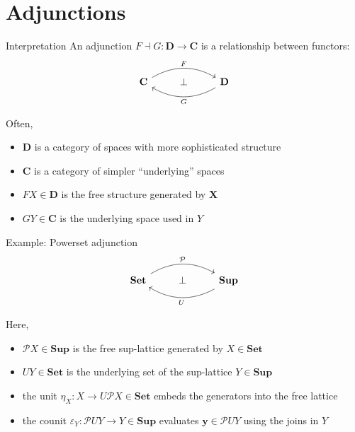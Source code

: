 \documentclass[aspectratio=1610,mathserif]{beamer}
\begin{document}
\section{Adjunctions} %
\frame\sectionpage

\begin{frame}[fragile]{Interpretation}
  An adjunction $F \dashv G : \mathbf{D} \rightarrow \mathbf{C}$
  is a relationship between functors:
  \[
    \begin{tikzcd}
      \mathbf{C} \ar[rr, bend left, "F"] &
      \bot &
      \mathbf{D} \ar[ll, bend left, "G"]
    \end{tikzcd}
  \]

  Often,
  \begin{itemize}
    \item $\mathbf{D}$ is a category of spaces with more sophisticated structure
    \item $\mathbf{C}$ is a category of simpler ``underlying'' spaces
    \item $F X \in \mathbf{D}$ is the free structure generated by $\mathbf{X}$
    \item $G Y \in \mathbf{C}$ is the underlying space used in $Y$
  \end{itemize}
\end{frame}

\begin{frame}[fragile]{Example: Powerset adjunction}
  \[
    \begin{tikzcd}
      \mathbf{Set} \ar[rr, bend left, "\mathcal{P}"] &
      \bot &
      \mathbf{Sup} \ar[ll, bend left, "U"]
    \end{tikzcd}
  \]

  Here,
  \begin{itemize}
    \item $\mathcal{P} X \in \mathbf{Sup}$ is
      the free sup-lattice generated by $X \in \mathbf{Set}$
    \item $U Y \in \mathbf{Set}$ is the underlying set of
      the sup-lattice $Y \in \mathbf{Sup}$
    \item the unit $\eta_X : X \rightarrow U\mathcal{P} X \in \mathbf{Set}$
      embeds the generators into the free lattice
    \item the counit
      $\varepsilon_Y : \mathcal{P} U Y \rightarrow Y \in \mathbf{Sup}$
      evaluates $\mathbf{y} \in \mathcal{P}UY$ using
      the joins in $Y$ 
  \end{itemize}
\end{frame}
\end{document}
